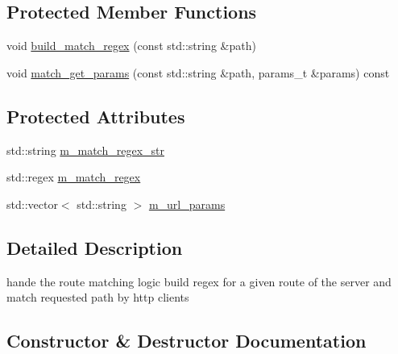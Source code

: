 \subsection*{Protected Member Functions}
\begin{DoxyCompactItemize}
\item 
void \hyperlink{classnetflex_1_1routing_1_1route__matcher_a01bd617a02db70923d6088fa6ab466c5}{build\+\_\+match\+\_\+regex} (const std\+::string \&path)
\item 
void \hyperlink{classnetflex_1_1routing_1_1route__matcher_af2cdb76cebb622b34765cedfbdd46cf2}{match\+\_\+get\+\_\+params} (const std\+::string \&path, params\+\_\+t \&params) const
\end{DoxyCompactItemize}
\subsection*{Protected Attributes}
\begin{DoxyCompactItemize}
\item 
std\+::string \hyperlink{classnetflex_1_1routing_1_1route__matcher_a3c13952acd046bdf9af2e2a5852ec350}{m\+\_\+match\+\_\+regex\+\_\+str}
\item 
std\+::regex \hyperlink{classnetflex_1_1routing_1_1route__matcher_a4968f359373528ec77417b1fe799caf8}{m\+\_\+match\+\_\+regex}
\item 
std\+::vector$<$ std\+::string $>$ \hyperlink{classnetflex_1_1routing_1_1route__matcher_a33346356f8d0733e62aeb2986446606c}{m\+\_\+url\+\_\+params}
\end{DoxyCompactItemize}


\subsection{Detailed Description}
hande the route matching logic build regex for a given route of the server and match requested path by http clients 

\subsection{Constructor \& Destructor Documentation}
\mbox{\label{classnetflex_1_1routing_1_1route__matcher_a9cf8d8ed16becad2d6952f66caed18c0}} 
